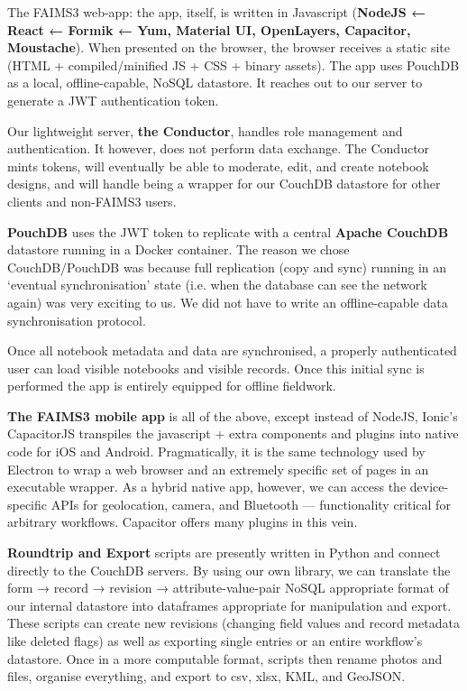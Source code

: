 \documentclass[a0,portrait]{a0poster}
\begin{document}
\begin{multicols}{3}
The FAIMS3 web-app: the app, itself, is written in Javascript (\textbf{NodeJS ← React ← Formik ← Yum, Material UI, OpenLayers, Capacitor, Moustache}). When presented on the browser, the browser receives a static site (HTML + compiled/minified JS + CSS + binary assets). The app uses PouchDB as a local, offline-capable, NoSQL datastore. It reaches out to our server to generate a JWT authentication token.

Our lightweight server, \textbf{the Conductor}, handles role management and authentication. It however, does not perform data exchange. The Conductor mints tokens, will eventually be able to moderate, edit, and create notebook designs, and will handle being a wrapper for our CouchDB datastore for other clients and non-FAIMS3 users.

\textbf{PouchDB} uses the JWT token to replicate with a central \textbf{Apache CouchDB} datastore running in a Docker container. The reason we chose CouchDB/PouchDB was because full replication (copy and sync) running in an `eventual synchronisation' state (i.e. when the database can see the network again) was very exciting to us. We did not have to write an offline-capable data synchronisation protocol.

Once all notebook metadata and data are synchronised, a properly authenticated user can load visible notebooks and visible records. Once this initial sync is performed the app is entirely equipped for offline fieldwork.

\textbf{The FAIMS3 mobile app} is all of the above, except instead of NodeJS, Ionic’s CapacitorJS transpiles the javascript + extra components and plugins into native code for iOS and Android. Pragmatically, it is the same technology used by Electron to wrap a web browser and an extremely specific set of pages in an executable wrapper. As a hybrid native app, however, we can access the device-specific APIs for geolocation, camera, and Bluetooth — functionality critical for arbitrary workflows. Capacitor offers many plugins in this vein.



\columnbreak

\textbf{Roundtrip and Export} scripts are presently written in Python and connect directly to the CouchDB servers. By using our own library, we can translate the form → record → revision → attribute-value-pair NoSQL appropriate format of our internal datastore into dataframes appropriate for manipulation and export. These scripts can create new revisions (changing field values and record metadata like deleted flags) as well as exporting single entries or an entire workflow's datastore. Once in a more computable format, scripts then rename photos and files, organise everything, and export to csv, xlsx, KML, and GeoJSON.






\end{multicols}
\end{document}
